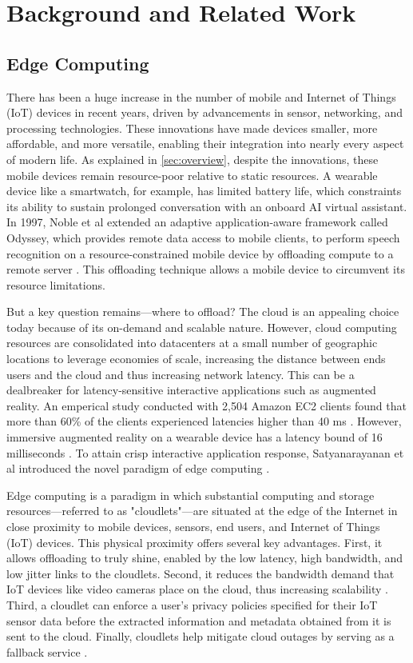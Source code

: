 \chapter{Background and Related Work}

\section{Edge Computing}
\label{sec:bg-edge}

There has been a huge increase in the number of mobile and Internet of Things
(IoT) devices in recent years, driven by advancements in sensor, networking,
and processing technologies.  These innovations have made devices smaller, more
affordable, and more versatile, enabling their integration into nearly every
aspect of modern life. As explained in \cref{sec:overview}, despite the
innovations, these mobile devices remain resource-poor relative to static
resources. A wearable device like a smartwatch, for example, has limited
battery life, which constraints its ability to sustain prolonged conversation
with an onboard AI virtual assistant. In 1997, Noble et al extended an adaptive
application-aware framework called Odyssey, which provides remote data access
to mobile clients, to perform speech recognition on a resource-constrained
mobile device by offloading compute to a remote server \cite{noble1997}. This
offloading technique allows a mobile device to circumvent its resource
limitations.

But a key question remains---where to offload? The cloud is an
appealing choice today because of its on-demand and scalable nature. However,
cloud computing resources are consolidated into datacenters at a small number
of geographic locations to leverage economies of scale, increasing the distance
between ends users and the cloud and thus increasing network latency. This can
be a dealbreaker for latency-sensitive interactive applications such as
augmented reality. An emperical study conducted with 2,504 Amazon EC2 clients
found that more than 60\% of the clients experienced latencies higher than 40
ms \cite{choy2012}. However, immersive augmented reality on a wearable device
has a latency bound of 16 milliseconds \cite{ellis2004}.
To attain crisp interactive application response,
Satyanarayanan et al introduced the novel paradigm of edge computing
\cite{satya2009}.


Edge computing is a paradigm in which substantial computing and storage
resources---referred to as "cloudlets"---are situated at the edge of the
Internet in close proximity to mobile devices, sensors, end users, and Internet
of Things (IoT) devices. This physical proximity offers several key advantages.
First, it allows offloading to truly shine, enabled by the low latency, high
bandwidth, and low jitter links to the cloudlets. Second, it reduces the
bandwidth demand that IoT devices like video cameras place on the cloud, thus
increasing scalability \cite{premsankar2018}. Third, a cloudlet can enforce a
user's privacy policies specified for their IoT sensor data before the
extracted information and metadata obtained from it is sent to the cloud.
Finally, cloudlets help mitigate cloud outages by serving as a fallback service
\cite{satya2017}.

